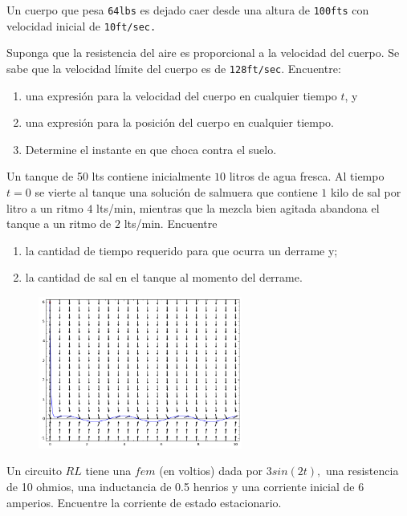 	\begin{problema}
	Un cuerpo que pesa \texttt{64lbs} es dejado caer desde una altura de \texttt{100fts} con velocidad inicial de \texttt{10ft/sec.}

	Suponga que la resistencia del aire es proporcional a la velocidad del cuerpo. Se sabe que la velocidad límite del cuerpo es de \texttt{128ft/sec}. Encuentre:
	\begin{enumerate}
		\item una expresión para la velocidad del cuerpo en cualquier tiempo $t$,  y
		\item una expresión para la posición del cuerpo en cualquier tiempo.
		\item Determine el instante en que choca contra el suelo.
	\end{enumerate}

\end{problema}


\begin{problema}
	Un tanque de 50 lts contiene inicialmente $10$ litros de agua fresca. Al tiempo $t=0$ se vierte al tanque una solución de salmuera que contiene $1$ kilo de sal por litro a un ritmo $4$ lts/min, mientras que la mezcla bien agitada abandona el tanque a un ritmo de $2$ lts/min. Encuentre
	\begin{enumerate}
		\item la cantidad de tiempo requerido para que ocurra un derrame y;
		\item la cantidad de sal en el tanque al momento del derrame.
	\end{enumerate}

\end{problema}

\begin{figure}
	\centering
	\includegraphics[height=5cm,keepaspectratio=true]{./edo/img020505.png}
	\label{fig:020505}
\end{figure}

\begin{problema}
	Un circuito $RL$ tiene una $fem$ (en voltios) dada por $3sin(2t),$ una resistencia de 10 ohmios, una inductancia de 0.5 henrios y una corriente inicial de 6 amperios. Encuentre la corriente de estado estacionario.
\end{problema}




